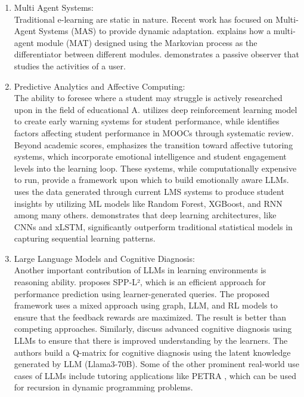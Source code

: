 \begin{enumerate}
	\item Multi Agent Systems: \\
	Traditional e-learning are static in nature. Recent work has focused on Multi-Agent Systems (MAS) to provide dynamic adaptation. \textcite{zakaria2025} explains how a multi-agent module (MAT) designed using the Markovian process as the differentiator between different modules. \textcite{vukovic2021} demonstrates a passive observer that studies the activities of a user. %
	
	\item Predictive Analytics and Affective Computing: \\
	The ability to foresee where a student may struggle is actively researched upon in the field of educational A. \textcite{bagunaid2024} utilizes deep reinforcement learning model to create early warning systems for student performance, while \textcite{rizwan2025} identifies factors affecting student performance in MOOCs through systematic review. Beyond academic scores, \textcite{hasan2020} emphasizes the transition toward affective tutoring systems, which incorporate emotional intelligence and student engagement levels \cite{ayouni2021} into the learning loop. These systems, while computationally expensive to run, provide a framework upon which to build emotionally aware LLMs. 
	\textcite{mahafdah2024} uses the data generated through current LMS systems to produce student insights by utilizing ML models like Random Forest, XGBoost, and RNN among many others. \textcite{aderghal2025} demonstrates that deep learning architectures, like CNNs and xLSTM, significantly outperform traditional statistical models in capturing sequential learning patterns.
	
	\item Large Language Models and Cognitive Diagnosis: \\
    Another important contribution of LLMs in learning environments is reasoning ability. \textcite{zhang2025} proposes SPP-L², which is an efficient approach for performance prediction using learner-generated queries. The proposed framework uses a mixed approach using graph, LLM, and RL models to ensure that the feedback rewards are maximized. The result is better than competing approaches. Similarly, \textcite{chen2025} discuss advanced cognitive diagnosis using LLMs to ensure that there is improved understanding by the learners. The authors build a Q-matrix for cognitive diagnosis using the latent knowledge generated by LLM (Llama3-70B). Some of the other prominent real-world use cases of LLMs include tutoring applications like PETRA \cite{hewedy2025}, which can be used for recursion in dynamic programming problems.
	

\end{enumerate}

